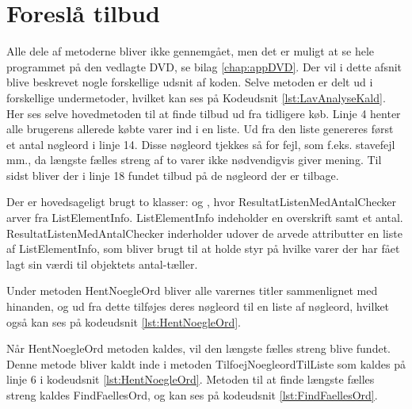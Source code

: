 \label{sec:udviklingforeslaatilbud}
\section{Foreslå tilbud}
Alle dele af metoderne bliver ikke gennemgået, men det er muligt at se hele programmet på den vedlagte DVD, se bilag \ref{chap:appDVD}. Der vil i dette afsnit blive beskrevet nogle forskellige udsnit af koden.
Selve metoden er delt ud i forskellige undermetoder, hvilket kan ses på Kodeudsnit \ref{lst:LavAnalyseKald}. Her ses selve hovedmetoden til at finde tilbud ud fra tidligere køb. Linje 4 henter alle brugerens allerede købte varer ind i en liste. Ud fra den liste genereres først et antal nøgleord i linje 14. Disse nøgleord tjekkes så for fejl, som f.eks. stavefejl mm., da længste fælles streng af to varer ikke nødvendigvis giver mening. Til sidst bliver der i linje 18 fundet tilbud på de nøgleord der er tilbage. 

Der er hovedsageligt brugt to klasser:  og , hvor ResultatListenMedAntalChecker arver fra ListElementInfo. ListElementInfo indeholder en overskrift samt et antal. ResultatListenMedAntalChecker inderholder udover de arvede attributter en liste af ListElementInfo, som bliver brugt til at holde styr på hvilke varer der har fået lagt sin værdi til objektets antal-tæller.


Under metoden HentNoegleOrd bliver alle varernes titler sammenlignet med hinanden, og ud fra dette tilføjes deres nøgleord til en liste af nøgleord, hvilket også kan ses på kodeudsnit \ref{lst:HentNoegleOrd}.


Når HentNoegleOrd metoden kaldes, vil den længste fælles streng blive fundet. Denne metode bliver kaldt inde i metoden TilfoejNoegleordTilListe som kaldes på linje 6 i kodeudsnit \ref{lst:HentNoegleOrd}. Metoden til at finde længste fælles streng kaldes FindFaellesOrd, og kan ses på kodeudsnit \ref{lst:FindFaellesOrd}.


